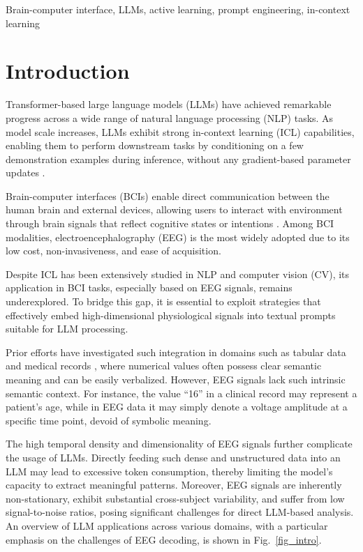 \documentclass[journal,twocolumn]{IEEEtran}
\begin{document}
\begin{IEEEkeywords}
Brain-computer interface, LLMs, active learning, prompt engineering, in-context learning
\end{IEEEkeywords}

\IEEEpeerreviewmaketitle

\section{Introduction}

Transformer-based large language models (LLMs) \cite{vaswani2017attention} have achieved remarkable progress across a wide range of natural language processing (NLP) tasks. As model scale increases, LLMs exhibit strong in-context learning (ICL) capabilities, enabling them to perform downstream tasks by conditioning on a few demonstration examples during inference, without any gradient-based parameter updates \cite{brown2020language}.

Brain-computer interfaces (BCIs) \cite{Lance2012, Wolpaw2002} enable direct communication between the human brain and external devices, allowing users to interact with environment through brain signals that reflect cognitive states or intentions \cite{he2019transfer}. Among BCI modalities, electroencephalography (EEG) is the most widely adopted due to its low cost, non-invasiveness, and ease of acquisition.

Despite ICL has been extensively studied in NLP and computer vision (CV), its application in BCI tasks, especially based on EEG signals, remains underexplored. To bridge this gap, it is essential to exploit strategies that effectively embed high-dimensional physiological signals into textual prompts suitable for LLM processing.

Prior efforts have investigated such integration in domains such as tabular data \cite{hegselmann2023tabllm, liu2025umman} and medical records \cite{liu2023large}, where numerical values often possess clear semantic meaning and can be easily verbalized. However, EEG signals lack such intrinsic semantic context. For instance, the value “16” in a clinical record may represent a patient’s age, while in EEG data it may simply denote a voltage amplitude at a specific time point, devoid of symbolic meaning.

The high temporal density and dimensionality of EEG signals further complicate the usage of LLMs. Directly feeding such dense and unstructured data into an LLM may lead to excessive token consumption, thereby limiting the model’s capacity to extract meaningful patterns. Moreover, EEG signals are inherently non-stationary, exhibit substantial cross-subject variability, and suffer from low signal-to-noise ratios, posing significant challenges for direct LLM-based analysis. An overview of LLM applications across various domains, with a particular emphasis on the challenges of EEG decoding, is shown in Fig.~\ref{fig_intro}.
\end{document}
